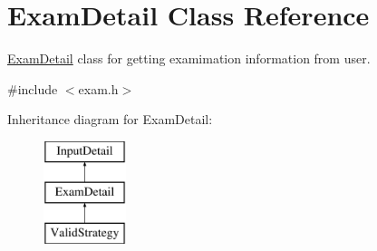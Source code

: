 \hypertarget{classExamDetail}{\section{Exam\-Detail Class Reference}
\label{classExamDetail}
}


\hyperlink{classExamDetail}{Exam\-Detail} class for getting examimation information from user.  




{\ttfamily \#include $<$exam.\-h$>$}

Inheritance diagram for Exam\-Detail\-:\begin{figure}[H]
\begin{center}
\leavevmode
\includegraphics[height=3.000000cm]{classExamDetail}
\end{center}
\end{figure}
